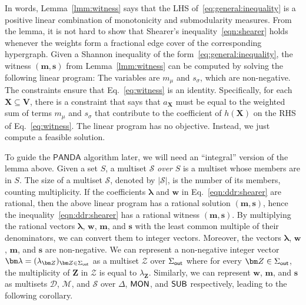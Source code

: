 \documentclass{theoretics}
\newcommand{\calM}{\mathcal M}
\newcommand{\calS}{\mathcal S}
\newcommand{\calD}{\mathcal D}
\newcommand{\calZ}{\mathcal Z}
\newcommand{\out}{\text{\sf out}}
\newcommand{\mon}{\text{\sf MON}}
\newcommand{\sub}{\text{\sf SUB}}
\newcommand{\panda}{\textsf{PANDA}\xspace}
\begin{document}
%
In words, Lemma~\ref{lmm:witness} says that the LHS of~\eqref{eq:general:inequality} is a
positive linear combination of monotonicity and submodularity measures. From the lemma, it is
not hard to show that Shearer's inequality~\eqref{eqn:shearer} holds whenever the weights
form a fractional edge cover of the corresponding hypergraph.
Given a Shannon inequality of the form~\eqref{eq:general:inequality},
the witness $(\bm m, \bm s)$
from Lemma~\ref{lmm:witness} can be computed by solving the following linear program:
The variables are $m_\mu$ and $s_\sigma$, which are non-negative.
The constraints ensure that Eq.~\eqref{eq:witness} is an identity.
Specifically, for each $\bm X \subseteq \bm V$, there is a constraint
that says that $a_{\bm X}$ must be equal to the weighted sum of terms $m_\mu$ and $s_\sigma$ that contribute to the coefficient of $h(\bm X)$ on the RHS of Eq.~\eqref{eq:witness}.
The linear program has no objective. Instead, we just compute a feasible solution.


To guide the $\panda$ algorithm later, we will need an ``integral'' version of the lemma above.
Given a set $S$, a multiset $\calS$ {\em over} $S$ is a multiset whose members are in $S$. The
size of a multiset $\calS$, denoted by $|\calS|$, is the number of its members, counting
multiplicity.
If the coefficients $\bm \lambda$ and $\bm w$ in Eq.~\eqref{eqn:ddr:shearer} are rational, then the above linear program has a rational solution
$(\bm m, \bm s)$, hence
the inequality~\eqref{eqn:ddr:shearer} has a rational witness $(\bm m, \bm s)$.
By multiplying the rational vectors $\bm \lambda$, $\bm w$, $\bm m$, and $\bm s$
with
the least common multiple of their denominators, we can convert
them to integer vectors.
Moreover, the vectors $\bm \lambda$, $\bm w$, $\bm m$, and $\bm s$ are non-negative.
We can represent a non-negative integer vector $\bm \lambda = (\lambda_{\bm Z})_{\bm Z \in\Sigma_{\out}}$ as a multiset $\calZ$ over $\Sigma_\out$
where for every $\bm Z \in\Sigma_{\out}$, the multiplicity of $\bm Z$ in $\calZ$ is equal to
$\lambda_{\bm Z}$. Similarly, we can represent $\bm w$, $\bm m$, and $\bm s$ as multisets $\calD$, $\calM$, and $\calS$ over $\Delta$, $\mon$, and $\sub$ respectively, leading to the following corollary.
\end{document}
